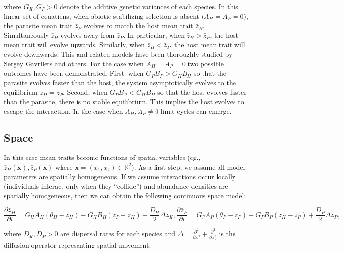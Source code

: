 \documentclass{article}
\begin{document}
where \(G_H,G_P>0\) denote the additive genetic variances of each
species. In this linear set of equations, when abiotic stabilizing
selection is absent (\(A_H=A_P=0\)), the parasite mean trait
\(\bar z_P\) evolves to match the host mean trait \(\bar z_H\).
Simultaneously \(\bar z_H\) evolves away from \(\bar z_P\). In
particular, when \(\bar z_H>\bar z_P\), the host mean trait will evolve
upwards. Similarly, when \(\bar z_H<\bar z_P\), the host mean trait will
evolve downwards. This and related models have been thoroughly studied
by Sergey Gavrilets and others. For the case when \(A_H=A_P=0\) two
possible outcomes have been demonstrated. First, when \(G_PB_P>G_HB_H\)
so that the parasite evolves faster than the host, the system
asymptotically evolves to the equilibrium \(\bar z_H=\bar z_P\). Second,
when \(G_PB_P<G_HB_H\) so that the host evolves faster than the
parasite, there is no stable equilibrium. This implies the host evolves
to escape the interaction. In the case when \(A_H,A_P\neq0\) limit
cycles can emerge.

\hypertarget{space}{%
\subsection{Space}\label{space}}

In this case mean traits become functions of spatial variables (eg.,
\(\bar z_H(\pmb x),\bar z_P(\pmb x)\) where
\(\pmb x=(x_1,x_2)\in\mathbb R^2\)). As a first step, we assume all
model parameters are spatially homogeneous. If we assume interactions
occur locally (individuals interact only when they \enquote{collide})
and abundance densities are spatially homogeneous, then we can obtain
the following continuous space model:

\begin{subequations}\label{deterministic}
  \begin{equation}
    \frac{\partial\bar z_H}{\partial t}=G_HA_H(\theta_H-\bar z_H)-G_HB_H(\bar z_P-\bar z_H)+\frac{D_H}{2}\Delta\bar z_H,
  \end{equation}
  \begin{equation}
    \frac{\partial\bar z_P}{\partial t}=G_PA_P(\theta_P-\bar z_P)+G_PB_P(\bar z_H-\bar z_P)+\frac{D_P}{2}\Delta\bar z_P,
  \end{equation}
\end{subequations}

where \(D_H,D_P>0\) are dispersal rates for each species and
\(\Delta=\frac{\partial^2}{\partial x_1^2}+\frac{\partial^2}{\partial x_2^2}\)
is the diffusion operator representing spatial movement.
\end{document}
